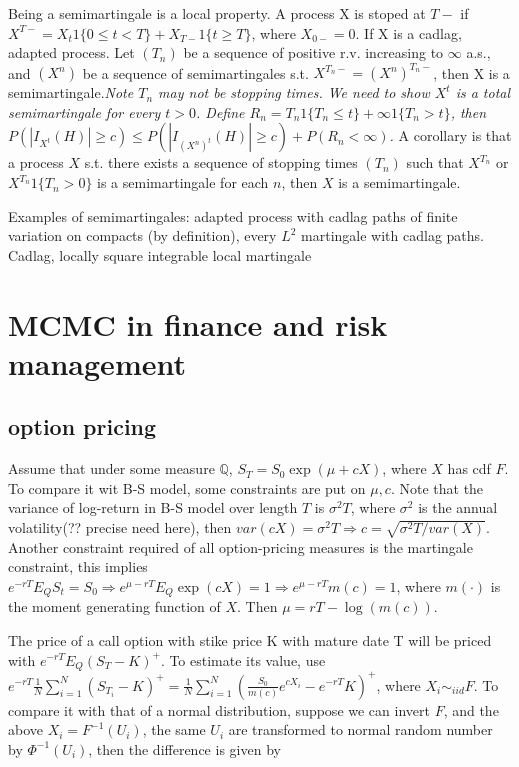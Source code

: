 \documentclass[11pt,a4paper]{article}
\begin{document}
Being a semimartingale is a local property. A process X is stoped at $ T- $ if $ X^{T-}=X_t 1\{0\leq t <T\}+X_{T-} 1\{t\geq T\} $, where $ X_{0-}=0 $. If X is a cadlag, adapted process. Let $ (T_n) $ be a sequence of positive r.v. increasing to $ \infty $ a.s., and $ (X^n) $ be a sequence of semimartingales s.t. $ X^{T_n-}=(X^n)^{T_n-} $, then X is a semimartingale.{\small \em Note $ T_n $ may not be stopping times. We need to show $ X^t $ is a total semimartingale for every $ t>0 $. Define $ R_n= T_n 1\{T_n\leq t\} +\infty 1\{T_n > t\} $, then $ P(|I_{X^t}(H)| \geq c)\leq P(|I_{(X^n)^t}(H)|\geq c) +P(R_n<\infty)$. } A corollary is that a process $ X $ s.t. there exists a sequence of stopping times $ (T_n) $ such that $ X^{T_n} $ or $ X^{T_n} 1\{T_n>0\} $ is a semimartingale for each $ n $, then $ X $ is a semimartingale.

Examples of semimartingales: adapted process with cadlag paths of finite variation on compacts (by definition), every $ L^2 $ martingale with cadlag paths. Cadlag, locally square integrable local martingale


\section{ MCMC in finance and risk management}

\subsection{option pricing}

Assume that under some measure $ \mathbb{Q} $, $ S_T=S_0 \exp(\mu+cX) $, where $ X $ has cdf $ F$. To compare it wit B-S model, some constraints are put on $\mu, c $. Note that the variance of log-return in B-S model over length $ T $ is $ \sigma^2T $, where $ \sigma^2 $ is the annual volatility(?? precise need here), then $ var(cX)=\sigma^2T\Rightarrow c=\sqrt{\sigma^2T/var(X)} $. Another constraint required of all option-pricing measures is the martingale constraint, this implies $ e^{-rT}E_Q S_t=S_0 \Rightarrow e^{\mu-rT}E_Q\exp(cX)=1\Rightarrow e^{\mu-rT}m(c)=1 $, where $ m(\cdot) $ is the moment generating function of $ X $. Then $ \mu=rT-\log(m(c)) $. 

The price of a call option with stike price K with mature date T will be priced with $ e^{-rT}E_Q(S_T-K)^+ $. To estimate its value, use $ e^{-rT}\frac{1}{N}\sum_{i=1}^N(S_{T_i}-K)^+=\frac{1}{N}\sum_{i=1}^N{(\frac{S_0}{m(c)}e^{cX_i}-e^{-rT}K)^+} $, where $ X_i\sim_{iid} F $. To compare it with that of a normal distribution, suppose we can invert $ F $, and the above $ X_i=F^{-1}(U_i) $, the same $ U_i $ are transformed to normal random number by $ \Phi^{-1}(U_i) $, then the difference is given by 
\end{document}
